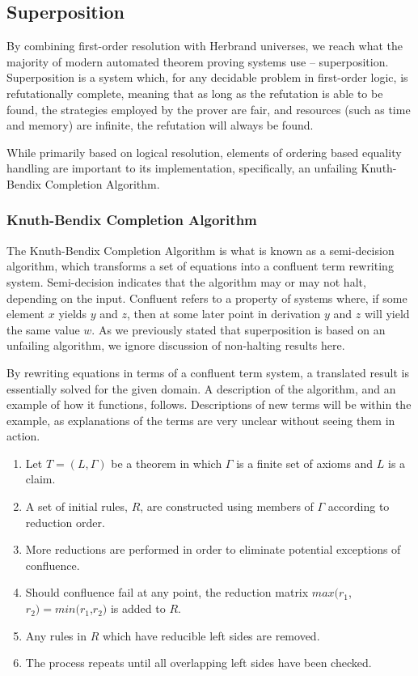 \subsection{Superposition}

By combining first-order resolution with Herbrand universes, we reach what the majority of modern automated theorem proving systems use -- superposition. Superposition is a system which, for any decidable problem in first-order logic, is refutationally complete, meaning that as long as the refutation is able to be found, the strategies employed by the prover are fair, and resources (such as time and memory) are infinite, the refutation will always be found.

While primarily based on logical resolution, elements of ordering based equality handling are important to its implementation, specifically, an unfailing Knuth-Bendix Completion Algorithm.

\subsubsection{Knuth-Bendix Completion Algorithm}

The Knuth-Bendix Completion Algorithm is what is known as a semi-decision algorithm, which transforms a set of equations into a confluent term rewriting system. Semi-decision indicates that the algorithm may or may not halt, depending on the input. Confluent refers to a property of systems where, if some element $x$ yields $y$ and $z$, then at some later point in derivation $y$ and $z$ will yield the same value $w$. As we previously stated that superposition is based on an unfailing algorithm, we ignore discussion of non-halting results here.

By rewriting equations in terms of a confluent term system, a translated result is essentially solved for the given domain. A description of the algorithm, and an example of how it functions, follows. Descriptions of new terms will be within the example, as explanations of the terms are very unclear without seeing them in action.

\begin{enumerate}
	\item Let $T=(L,\Gamma)$ be a theorem in which $\Gamma$ is a finite set of axioms and $L$ is a claim.
	\item A set of initial rules, $R$, are constructed using members of $\Gamma$ according to reduction order.
	\item More reductions are performed in order to eliminate potential exceptions of confluence.
	\item Should confluence fail at any point, the reduction matrix $max(r_1$,$r_2)=min(r_1$,$r_2)$ is added to $R$.
	\item Any rules in $R$ which have reducible left sides are removed.
	\item The process repeats until all overlapping left sides have been checked.
\end{enumerate}

